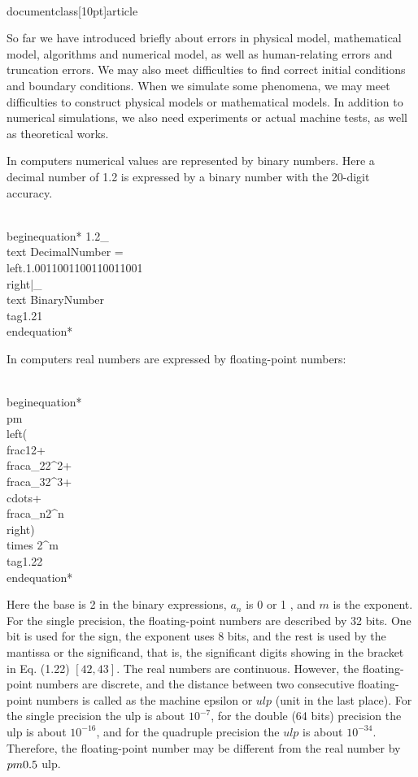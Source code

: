 \\documentclass[10pt]{article}
\begin{document}
So far we have introduced briefly about errors in physical model, mathematical model, algorithms and numerical model, as well as human-relating errors and truncation errors. We may also meet difficulties to find correct initial conditions and boundary conditions. When we simulate some phenomena, we may meet difficulties to construct physical models or mathematical models. In addition to numerical simulations, we also need experiments or actual machine tests, as well as theoretical works.

In computers numerical values are represented by binary numbers. Here a decimal number of 1.2 is expressed by a binary number with the 20-digit accuracy.


\\begin{equation*}
1.2_{\\text {DecimalNumber }}=\\left.1.0011001100110011001\\right|_{\\text {BinaryNumber }} \\tag{1.21}
\\end{equation*}


In computers real numbers are expressed by floating-point numbers:


\\begin{equation*}
\\pm\\left(\\frac{1}{2}+\\frac{a_{2}}{2^{2}}+\\frac{a_{3}}{2^{3}}+\\cdots+\\frac{a_{n}}{2^{n}}\\right) \\times 2^{m} \\tag{1.22}
\\end{equation*}


Here the base is 2 in the binary expressions, $a_{n}$ is 0 or 1 , and $m$ is the exponent. For the single precision, the floating-point numbers are described by 32 bits. One bit is used for the sign, the exponent uses 8 bits, and the rest is used by the mantissa or the significand, that is, the significant digits showing in the bracket in Eq. (1.22) $[42,43]$. The real numbers are continuous. However, the floating-point numbers are discrete, and the distance between two consecutive floating-point numbers is called as the machine epsilon or $u l p$ (unit in the last place). For the single precision the ulp is about $10^{-7}$, for the double (64 bits) precision the ulp is about $10^{-16}$, and for
the quadruple precision the $u l p$ is about $10^{-34}$. Therefore, the floating-point number may be different from the real number by $\\pm 0.5$ ulp.
\end{document}

